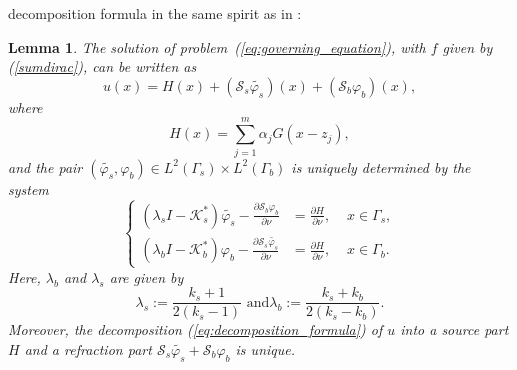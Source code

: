 \documentclass[final]{siamltex}
\numberwithin{equation}{section}
\numberwithin{figure}{section}
\numberwithin{table}{section}
\newtheorem{lem}{Lemma}
\begin{document}
decomposition formula in the same spirit as in \cite{kang1996}:
\begin{lem} \label{lemlatter} The solution of
problem~(\ref{eq:governing_equation}), with $f$ given by
(\ref{sumdirac}), can be written as
\begin{equation}
u(x)=H(x)+(\mathcal{S}_{s}\tilde{\varphi_{s}})(x)+(\mathcal{S}_{b}\varphi_{b})(x),\label{eq:decomposition_formula}
\end{equation}
 where
\begin{equation}
H(x)=\sum_{j=1}^{m}\alpha_{j}G(x-z_{j}),\label{eq:definition_H}
\end{equation}
 and the pair $(\tilde{\varphi_{s}},\varphi_{b})\in L^{2}(\Gamma_{s})\times L^{2}(\Gamma_{b})$
is uniquely determined by the system
\begin{equation}
\left\{ \begin{alignedat}{2}(\lambda_{s}I-\mathcal{K}_{s}^{*})\tilde{\varphi_{s}}-\frac{\partial\mathcal{S}_{b}\varphi_{b}}{\partial\nu} & =\frac{\partial H}{\partial\nu}, & \,\, x\in\Gamma_{s},\\
(\lambda_{b}I - \mathcal{K}_{b}^{*})\varphi_{b} -
\frac{\partial\mathcal{S}_{s}\tilde{\varphi_{s}}}{\partial\nu} & =
\frac{\partial H}{\partial\nu}, & \,\, x\in\Gamma_{b}.
\end{alignedat}
\right.\label{eq:definition_phis_phib}
\end{equation}
Here, $\lambda_b$ and $\lambda_s$ are given by
\begin{equation} \label{deflambdas}
\lambda_{s}:=\frac{k_{s}+1}{2(k_{s}-1)}\mbox{ and
}\lambda_{b}:=\frac{k_{s}+k_{b}}{2(k_{s}-k_{b})}.
\end{equation}
Moreover, the decomposition (\ref{eq:decomposition_formula}) of
$u$ into a source part $H$ and a refraction part
$\mathcal{S}_{s}\tilde{\varphi_{s}}+\mathcal{S}_{b}\varphi_{b}$ is
unique.\end{lem}
\end{document}
